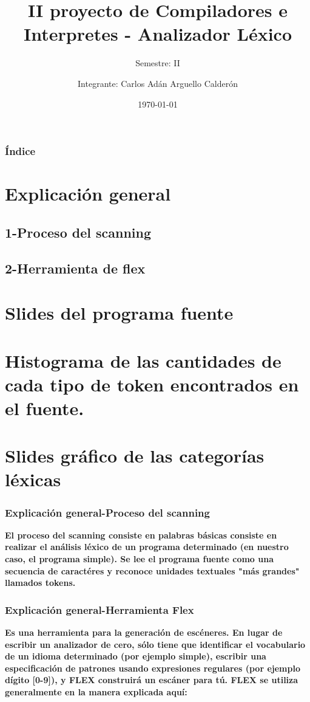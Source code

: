 \documentclass{beamer}
\title[Animales]{II proyecto de Compiladores e Interpretes - Analizador L\'exico}
\subtitle[short subtitle]{Semestre: II}
\author{Integrante: Carlos Ad\'an Arguello Calder\'on}
\institute{Instituto Tecnol\'ogico de Costa Rica}
\date{\today}
\begin{document}
\begin{frame}
   \titlepage {}
\end{frame}

\begin{frame}

	\frametitle{\'Indice}
	\tableofcontents
	
	\section{Explicaci\'on general}
	\subsection{1-Proceso del scanning}
	
	\subsection{2-Herramienta de flex}
	
	\section{Slides del programa fuente}
	
	\section{Histograma de las cantidades de cada tipo de token encontrados en el fuente.}
	
	\section{Slides gr\'afico de las categor\'ias l\'exicas}
		
\end{frame}

\begin{frame}
	\frametitle{Explicaci\'on general-Proceso del scanning}
	
	\textbf{El proceso del scanning consiste en
		palabras b\'asicas consiste en realizar el análisis l\'exico de un programa determinado (en nuestro caso, el programa simple). Se lee el programa fuente como una secuencia de caract\'eres y reconoce unidades textuales "m\'as grandes" llamados tokens. }
	
	
	
\end{frame}
	
\begin{frame}
	\frametitle{Explicaci\'on general-Herramienta Flex}
	
	\textbf{Es una herramienta para la generación de esc\'eneres. En lugar de escribir un analizador de cero, sólo tiene que identificar el vocabulario de un idioma determinado (por ejemplo simple), escribir una especificación de patrones usando expresiones regulares (por ejemplo dígito [0-9]), y FLEX construirá un escáner para tú. FLEX se utiliza generalmente en la manera explicada aquí: }
	
	
\end{frame}
\end{document}
